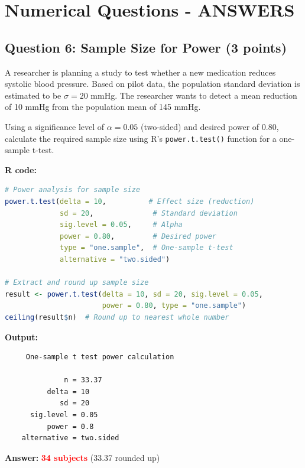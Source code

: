 \documentclass[11pt]{article}
\begin{document}
\newpage

\section*{Numerical Questions - ANSWERS}

\subsection*{Question 6: Sample Size for Power (3 points)}

A researcher is planning a study to test whether a new medication reduces systolic blood pressure. Based on pilot data, the population standard deviation is estimated to be $\sigma = 20$ mmHg. The researcher wants to detect a mean reduction of 10 mmHg from the population mean of 145 mmHg.

\vspace{0.3cm}

Using a significance level of $\alpha = 0.05$ (two-sided) and desired power of 0.80, calculate the required sample size using R's \texttt{power.t.test()} function for a one-sample t-test.

\vspace{0.3cm}

\textbf{R code:}

\begin{lstlisting}[language=R,basicstyle=\small\ttfamily,frame=single]
# Power analysis for sample size
power.t.test(delta = 10,          # Effect size (reduction)
             sd = 20,              # Standard deviation
             sig.level = 0.05,     # Alpha
             power = 0.80,         # Desired power
             type = "one.sample",  # One-sample t-test
             alternative = "two.sided")

# Extract and round up sample size
result <- power.t.test(delta = 10, sd = 20, sig.level = 0.05,
                       power = 0.80, type = "one.sample")
ceiling(result$n)  # Round up to nearest whole number
\end{lstlisting}

\textbf{Output:}
\begin{verbatim}
     One-sample t test power calculation

              n = 33.37
          delta = 10
             sd = 20
      sig.level = 0.05
          power = 0.8
    alternative = two.sided
\end{verbatim}

\textbf{Answer:} \textcolor{red}{\textbf{34 subjects}} (33.37 rounded up)
\end{document}
